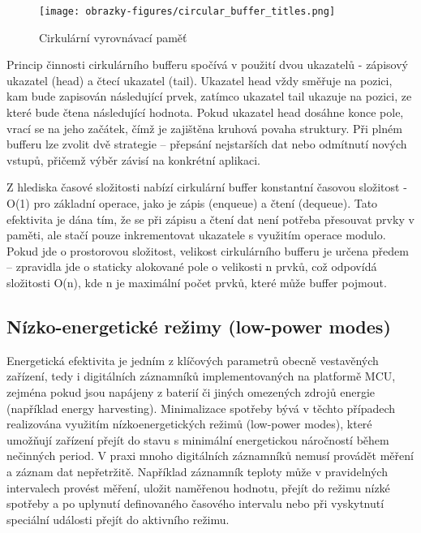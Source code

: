 \begin{figure}[h]
    \centering
    \texttt{[image: obrazky-figures/circular\_buffer\_titles.png]}
    
    \caption{Cirkulární vyrovnávací paměť}
    \label{fig:circular-buffer}
\end{figure}

Princip činnosti cirkulárního bufferu spočívá v použití dvou ukazatelů - zápisový ukazatel (head) a čtecí ukazatel (tail). Ukazatel 
head vždy směřuje na pozici, kam bude zapisován následující prvek, zatímco ukazatel tail ukazuje na pozici, ze které bude čtena 
následující hodnota. Pokud ukazatel head dosáhne konce pole, vrací se na jeho začátek, čímž je zajištěna kruhová povaha struktury. 
Při plném bufferu lze zvolit dvě strategie – přepsání nejstarších dat nebo odmítnutí nových vstupů, přičemž výběr závisí na konkrétní aplikaci. \cite{embedjournal_ring_buffer, medium_ring_buffer}

Z hlediska časové složitosti nabízí cirkulární buffer konstantní časovou složitost - O(1) pro základní operace, jako je zápis 
(enqueue) a  čtení (dequeue). Tato efektivita je dána tím, že se při zápisu a čtení dat není potřeba přesouvat prvky v paměti, 
ale stačí pouze inkrementovat ukazatele s využitím operace modulo. Pokud jde o prostorovou složitost, velikost cirkulárního bufferu 
je určena předem – zpravidla jde o staticky alokované pole o velikosti n prvků, což odpovídá složitosti O(n), kde n je maximální 
počet prvků, které může buffer pojmout. \cite{petrungaro_ring_buffer_complexity}

\subsection{Nízko-energetické režimy (low-power modes)}
Energetická efektivita je jedním z klíčových parametrů obecně vestavěných zařízení, tedy i digitálních záznamníků implementovaných 
na platformě MCU, zejména pokud jsou napájeny z baterií či jiných omezených zdrojů energie (například energy harvesting). 
Minimalizace spotřeby bývá v těchto případech realizována využitím nízkoenergetických režimů (low-power modes), které umožňují 
zařízení přejít do stavu s minimální energetickou náročností během nečinných period. V praxi mnoho digitálních záznamníků nemusí 
provádět měření a záznam dat nepřetržitě. Například záznamník teploty může v pravidelných intervalech provést měření, uložit 
naměřenou hodnotu, přejít do režimu nízké spotřeby a po uplynutí definovaného časového intervalu nebo při vyskytnutí speciální 
události přejít do aktivního režimu. \cite{analog_devices_low_power_modes}

